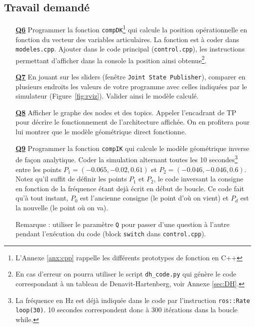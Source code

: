 \documentclass[12pt,a4paper]{article}
\begin{document}
\subsection{Travail demandé}
\label{travail2s}

\begin{itemize}
\medskip\item[\textbf{\underline{Q6}}] Programmer la fonction \texttt{compDK}\footnote{ L'Annexe \ref{anx:cpp} rappelle les différents prototypes de fonction en C++} qui calcule la position opérationnelle en fonction du vecteur des variables articulaires. La fonction est à coder dans \texttt{modeles.cpp}.
Ajouter dans le code principal (\texttt{control.cpp}), les instructions permettant d'afficher dans la console la position ainsi obtenue\footnote{En cas d'erreur on pourra utiliser le script \texttt{dh\_code.py} qui génère le code correspondant à un tableau de Denavit-Hartenberg, voir Annexe \ref{sec:DH}.}.


\medskip\item[\textbf{\underline{Q7}}] En jouant sur les sliders (fenêtre \texttt{Joint State Publisher}), comparer en plusieurs endroits les valeurs de votre programme avec celles indiquées par le simulateur (Figure~\ref{fig:rviz}).
Valider ainsi le modèle calculé.

\medskip\item[\textbf{\underline{Q8}}] Afficher le graphe des nodes et des topics. Appeler l'encadrant de TP pour décrire le fonctionnement de l'architecture affichée. On en profitera pour lui montrer que le modèle géométrique direct fonctionne.

\medskip\item[\textbf{\underline{Q9}}] Programmer la fonction \texttt{compIK} qui calcule le modèle géométrique inverse de façon analytique. 
Coder la simulation alternant toutes les 10 secondes\footnote{La fréquence en Hz est déjà indiquée dans le code par l'instruction \texttt{ros::Rate loop(30)}.
10 secondes correspondent donc à 300 itérations dans la boucle while.}
entre les points \linebreak $P_1=(-0.065,-0.02,0.61)$ et $P_2=(-0.046, -0.046, 0.6)$. \\
Notez qu'il suffit de définir les points $P_1$ et $P_2$, le code inversant la consigne en fonction de la fréquence étant dejà écrit en début de boucle.
Ce code fait qu'à tout instant, $P_0$ est l'ancienne consigne (le point d'où on vient) et $P_d$ est la nouvelle (le point où on va).

\medskip
Remarque : utiliser le paramètre \texttt{Q} pour passer d'une question à l'autre pendant l'exécution du code (block \texttt{switch} dans \texttt{control.cpp}).


\end{itemize}
\end{document}

